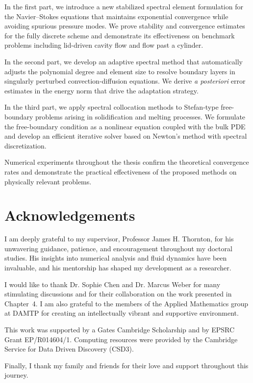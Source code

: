 \documentclass[12pt,a4paper,oneside]{report}
\begin{document}
In the first part, we introduce a new stabilized spectral element formulation for the Navier--Stokes equations that maintains exponential convergence while avoiding spurious pressure modes. We prove stability and convergence estimates for the fully discrete scheme and demonstrate its effectiveness on benchmark problems including lid-driven cavity flow and flow past a cylinder.

In the second part, we develop an adaptive spectral method that automatically adjusts the polynomial degree and element size to resolve boundary layers in singularly perturbed convection-diffusion equations. We derive \textit{a posteriori} error estimates in the energy norm that drive the adaptation strategy.

In the third part, we apply spectral collocation methods to Stefan-type free-boundary problems arising in solidification and melting processes. We formulate the free-boundary condition as a nonlinear equation coupled with the bulk PDE and develop an efficient iterative solver based on Newton's method with spectral discretization.

Numerical experiments throughout the thesis confirm the theoretical convergence rates and demonstrate the practical effectiveness of the proposed methods on physically relevant problems.

\chapter*{Acknowledgements}

I am deeply grateful to my supervisor, Professor James H. Thornton, for his unwavering guidance, patience, and encouragement throughout my doctoral studies. His insights into numerical analysis and fluid dynamics have been invaluable, and his mentorship has shaped my development as a researcher.

I would like to thank Dr. Sophie Chen and Dr. Marcus Weber for many stimulating discussions and for their collaboration on the work presented in Chapter~4. I am also grateful to the members of the Applied Mathematics group at DAMTP for creating an intellectually vibrant and supportive environment.

This work was supported by a Gates Cambridge Scholarship and by EPSRC Grant EP/R014604/1. Computing resources were provided by the Cambridge Service for Data Driven Discovery (CSD3).

Finally, I thank my family and friends for their love and support throughout this journey.
\end{document}
